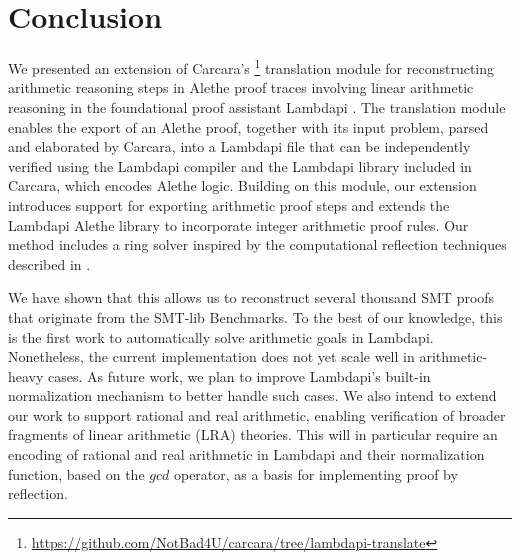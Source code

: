 \documentclass[runningheads,envcountsame]{llncs}
\begin{document}
\section{Conclusion}
\label{sec:conclusion}

We presented an extension of Carcara's \cite{carcara}\footnote{\url{https://github.com/NotBad4U/carcara/tree/lambdapi-translate}}
 translation module \cite{ColtellacciMD24} for reconstructing arithmetic reasoning steps in Alethe proof traces involving linear arithmetic reasoning in the foundational proof assistant Lambdapi \cite{lambdapi}.
The translation module enables the export of an Alethe proof, together with its input problem, parsed and elaborated by Carcara, into a Lambdapi file that can be independently verified using the Lambdapi compiler and the Lambdapi library included in Carcara, which encodes Alethe logic.
Building on this module, our extension introduces support for exporting arithmetic proof steps and extends the Lambdapi Alethe library to incorporate integer arithmetic proof rules.
Our method includes a ring solver inspired by the computational reflection techniques described in \cite{reflection-origin-coq,ring-coq}.

We have shown that this allows us to reconstruct several thousand SMT proofs that originate from the SMT-lib Benchmarks.
To the best of our knowledge, this is the first work to automatically solve arithmetic goals in Lambdapi.
Nonetheless, the current implementation does not yet scale well in arithmetic-heavy cases.
As future work, we plan to improve Lambdapi's built-in normalization mechanism to better handle such cases.
We also intend to extend our work to support rational and real arithmetic, enabling verification of broader fragments of linear arithmetic (LRA) theories.
This will in particular require an encoding of rational and real arithmetic in Lambdapi and their normalization function, based on the $\mathit{gcd}$ operator, as a basis for implementing proof by reflection.




%
\end{document}
